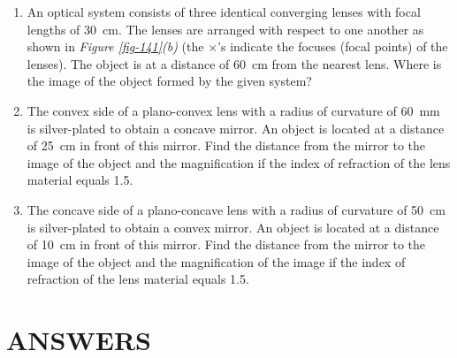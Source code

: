 \documentclass[a4paper,sfsidenotes]{tufte-book}
\begin{document}
\begin{enumerate}[resume=problems]
\item An optical system consists of three identical converging lenses with focal lengths of \SI{30}{\centi\metre}. The lenses are arranged with respect to one another as shown in \emph{Figure \ref{fig-141}(b)} (the $\times$'s indicate the focuses (focal points) of the lenses). The object is at a distance of \SI{60}{\centi\metre} from the nearest lens. Where is the image of the object formed by the given system?

\item The convex side of a plano-convex lens with a radius of curvature of \SI{60}{\milli\metre} is silver-plated to obtain a concave mirror. An object is located at a distance of \SI{25}{\centi\metre} in front of this mirror. Find the distance from the mirror to the image of the object and the magnification if the index of refraction of the lens material equals 1.5.

\item The concave side of a plano-concave lens with a radius of curvature of \SI{50}{\centi\metre} is silver-plated to obtain a convex mirror. An object is located at a distance of \SI{10}{\centi\metre} in front of this mirror. Find the distance from the mirror to the image of the object and the magnification of the image if the index of refraction of the lens material equals 1.5.
\end{enumerate}
\chapter*{ANSWERS}
{}
\label{answers}
\end{document}
